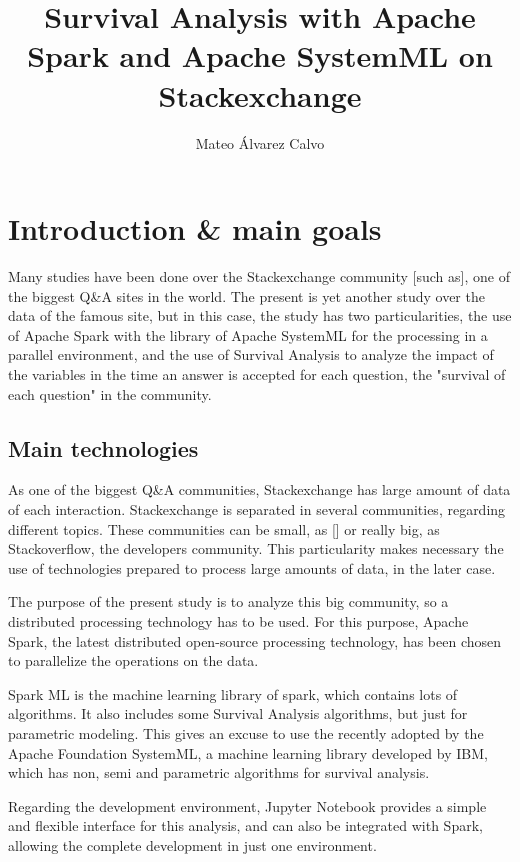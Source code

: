 \documentclass[11pt]{article} %
\title{Survival Analysis with Apache Spark and Apache SystemML on Stackexchange}
\author{Mateo Álvarez Calvo}
\begin{document}
\maketitle

\newpage
\tableofcontents
\newpage

\section{Introduction \& main goals}
  \label{sec:introduction}
  Many studies have been done over the Stackexchange community [such as], one of the biggest Q\&A sites in the world. The present is yet another study over the data of the famous site, but in this case, the study has two particularities, the use of Apache Spark with the library of Apache SystemML for the processing in a parallel environment, and the use of Survival Analysis to analyze the impact of the variables in the time an answer is accepted for each question, the "survival of each question" in the community.


  \subsection{Main technologies}

    As one of the biggest Q\&A communities, Stackexchange has large amount of data of each interaction.
    Stackexchange is separated in several communities, regarding different topics. These communities can be small, as [] or really big, as Stackoverflow, the developers community. This particularity makes necessary the use of technologies prepared to process large amounts of data, in the later case.

    The purpose of the present study is to analyze this big community, so a distributed processing technology has to be used. For this purpose, Apache Spark, the latest distributed open-source processing technology, has been chosen to parallelize the operations on the data.

    Spark ML is the machine learning library of spark, which contains lots of algorithms. It also includes some Survival Analysis algorithms, but just for parametric modeling. This gives an excuse to use the recently adopted by the Apache Foundation SystemML, a machine learning library developed by IBM, which has non, semi and parametric algorithms for survival analysis.

    Regarding the development environment, Jupyter Notebook provides a simple and flexible interface for this analysis, and can also be integrated with Spark, allowing the complete development in just one environment.
\end{document}
